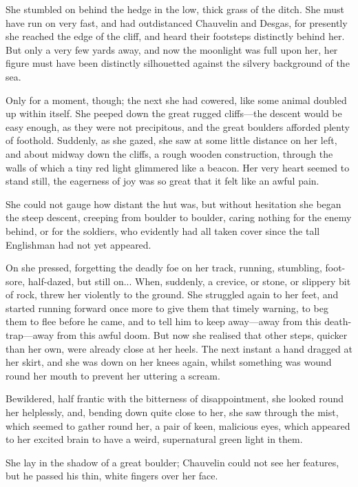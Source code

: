 She stumbled on behind the hedge in the low, thick grass of the ditch. She must have run on very fast, and had outdistanced Chauvelin and Desgas, for presently she reached the edge of the cliff, and heard their footsteps distinctly behind her. But only a very few yards away, and now the moonlight was full upon her, her figure must have been distinctly silhouetted against the silvery background of the sea.

Only for a moment, though; the next she had cowered, like some animal doubled up within itself. She peeped down the great rugged cliffs---the descent would be easy enough, as they were not precipitous, and the great boulders afforded plenty of foothold. Suddenly, as she gazed, she saw at some little distance on her left, and about midway down the cliffs, a rough wooden construction, through the walls of which a tiny red light glimmered like a beacon. Her very heart seemed to stand still, the eagerness of joy was so great that it felt like an awful pain.

She could not gauge how distant the hut was, but without hesitation she began the steep descent, creeping from boulder to boulder, caring nothing for the enemy behind, or for the soldiers, who evidently had all taken cover since the tall Englishman had not yet appeared.

On she pressed, forgetting the deadly foe on her track, running, stumbling, foot-sore, half-dazed, but still on... When, suddenly, a crevice, or stone, or slippery bit of rock, threw her violently to the ground. She struggled again to her feet, and started running forward once more to give them that timely warning, to beg them to flee before he came, and to tell him to keep away---away from this death-trap---away from this awful doom. But now she realised that other steps, quicker than her own, were already close at her heels. The next instant a hand dragged at her skirt, and she was down on her knees again, whilst something was wound round her mouth to prevent her uttering a scream.

Bewildered, half frantic with the bitterness of disappointment, she looked round her helplessly, and, bending down quite close to her, she saw through the mist, which seemed to gather round her, a pair of keen, malicious eyes, which appeared to her excited brain to have a weird, supernatural green light in them.

She lay in the shadow of a great boulder; Chauvelin could not see her features, but he passed his thin, white fingers over her face.

